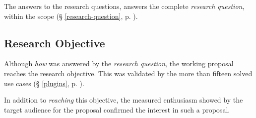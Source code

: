 The answers to the research questions, answers the complete
  \emph{research question}, within the scope (§ \ref{research-question},
  p. \pageref{research-question}).

\subsection{Research Objective}\label{q-research-objective}

Although \emph{how} was answered by the \emph{research question}, the
  working proposal reaches the research objective.
This was validated by the more than fifteen solved use cases
  (§ \ref{plugins}, p. \pageref{plugins}).

In addition to \emph{reaching} this objective, the measured enthusiasm
  showed by the target audience for the proposal confirmed the interest in
  such a proposal.

